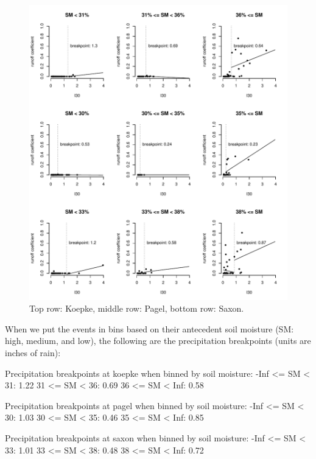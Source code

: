 \documentclass[12pt]{article}
\begin{document}
\begin{figure}
    \begin{center}
\includegraphics{runoff-I30_binned}
    \end{center}
    \caption{Top row: Koepke, middle row: Pagel, bottom row: Saxon.\label{I30_binned}}
\end{figure}


When we put the events in bins based on their antecedent soil moisture (SM: high, medium, and low), the following are the precipitation breakpoints (units are inches of rain):\\

\begin{Schunk}
\begin{Soutput}
Precipitation breakpoints at koepke when binned by soil moisture:
-Inf <= SM < 31: 1.22
31 <= SM < 36: 0.69
36 <= SM < Inf: 0.58

Precipitation breakpoints at pagel when binned by soil moisture:
-Inf <= SM < 30: 1.03
30 <= SM < 35: 0.46
35 <= SM < Inf: 0.85

Precipitation breakpoints at saxon when binned by soil moisture:
-Inf <= SM < 33: 1.01
33 <= SM < 38: 0.48
38 <= SM < Inf: 0.72
\end{Soutput}
\end{Schunk}
\end{document}
